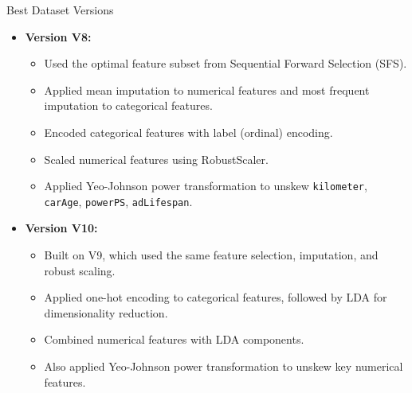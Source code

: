 \documentclass{beamer}
\begin{document}
\begin{frame}{Best Dataset Versions}
        \begin{itemize}
                \item \textbf{Version V8:}
                        \begin{itemize}
                                \item Used the optimal feature subset from
                                        Sequential Forward Selection (SFS).
                                \item Applied mean imputation to numerical
                                        features and most frequent imputation
                                        to categorical features.
                                \item Encoded categorical features with label
                                        (ordinal) encoding.
                                \item Scaled numerical features using
                                        RobustScaler.
                                \item Applied Yeo-Johnson power transformation
                                        to unskew \texttt{kilometer},
                                        \texttt{carAge}, \texttt{powerPS},
                                        \texttt{adLifespan}.
                        \end{itemize}
                \item \textbf{Version V10:}
                        \begin{itemize}
                                \item Built on V9, which used the same feature
                                        selection, imputation, and robust
                                        scaling.
                                \item Applied one-hot encoding to categorical
                                        features, followed by LDA for
                                        dimensionality reduction.
                                \item Combined numerical features with LDA
                                        components.
                                \item Also applied Yeo-Johnson power
                                        transformation to unskew key numerical
                                        features.
                        \end{itemize}
        \end{itemize}
\end{frame}
\end{document}
